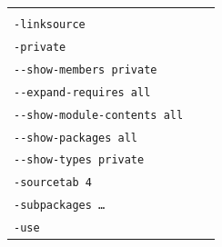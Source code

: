 \begin{longtable}{|l|l|X|}
{  \\ \texttt{-linksource}
  \\ \texttt{-private} 
  \\ \texttt{-{}-show-members private}
  \\ \texttt{-{}-expand-requires all}
  \\ \texttt{-{}-show-module-contents all}
  \\ \texttt{-{}-show-packages all}
  \\ \texttt{-{}-show-types private}
  \\ \texttt{-sourcetab 4}
  \\ \texttt{-subpackages …}
  \\ \texttt{-use}
  } \\
\hline


\end{longtable}

